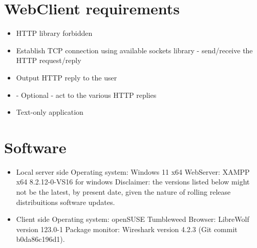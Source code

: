 \documentclass[11pt,a4paper]{report}
\begin{document}
    \section{WebClient requirements}
        \begin{itemize}
            \item HTTP library forbidden
            \item Establish TCP connection using available sockets library - send/receive the HTTP request/reply
            \item Output HTTP reply to the user
            \item - Optional - act to the various HTTP replies
            \item Text-only application
        \end{itemize}

    \section{Software}
        \begin{itemize}
            \item Local server side
                \subitem Operating system: Windows 11 x64
                \subitem WebServer: XAMPP x64 8.2.12-0-VS16 for windows
                Disclaimer: the versions listed below might not be the latest, by present date, given the nature of rolling release distribuitions software updates.
            \item Client side
                \subitem Operating system: openSUSE Tumbleweed
                \subitem Browser: LibreWolf version 123.0-1
                \subitem Package monitor: Wireshark version 4.2.3 (Git commit b0da86c196d1).
        \end{itemize}
\end{document}
